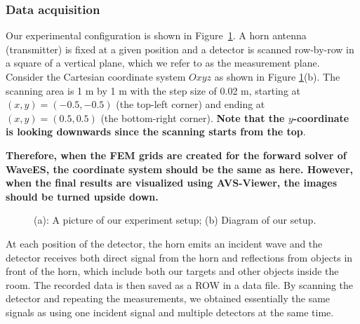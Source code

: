 \documentclass[a4paper,12pt]{article}
\begin{document}
\subsubsection{Data acquisition}

Our experimental configuration is shown in Figure~\ref{fig:setup}. A horn antenna (transmitter) is fixed at a given
position and a detector is scanned row-by-row in a square of a vertical plane, which we
refer to as the measurement plane. Consider the Cartesian coordinate system $%
Oxyz$ as shown in Figure \ref{fig:setup}(b). The scanning area is 1 m by 1
m with the step size of 0.02 m, starting at $(x,y)=(-0.5,-0.5)$ (the top-left corner) and ending at 
$(x,y)=(0.5,0.5)$ (the bottom-right corner). \textbf{Note that the $y$-coordinate is looking downwards since the scanning starts from the top}. 

\textbf{Therefore, when the FEM grids are created for the forward solver of WaveES, the coordinate system should be the same as here. However, when the final results are visualized using AVS-Viewer, the images should be turned upside down.}

\begin{figure}[tph]
\centering
{} \hspace{%
0.3truecm} 
\caption{(a): A picture of our experiment setup; (b) Diagram of our setup.}
\label{fig:setup}
\end{figure}

At each position of the detector, the horn emits an incident wave and the detector receives both direct signal from the horn and reflections from objects in front of the horn, which include both our targets and other objects inside the room. The recorded data is then saved as a ROW in a data file. By scanning the detector and repeating the
measurements, we obtained essentially the same signals as using one incident signal and multiple detectors at the same time.
\end{document}
